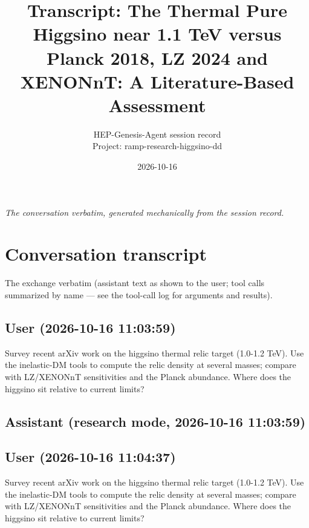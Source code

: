 \documentclass[11pt,a4paper]{article}
\title{Transcript: The Thermal Pure Higgsino near 1.1 TeV versus Planck 2018, LZ 2024 and XENONnT: A Literature-Based Assessment}
\author{HEP-Genesis-Agent session record \\ \small Project: ramp-research-higgsino-dd}
\date{2026-10-16}
\begin{document}
\maketitle
\noindent\textit{\small The conversation verbatim, generated mechanically from the session record.}
\vspace{1em}



\appendix
\section{Conversation transcript}
\label{app:transcript}
The exchange verbatim (assistant text as shown to the user; tool calls summarized by name --- see the tool-call log for arguments and results).
\subsection*{User \small(2026-10-16 11:03:59)}
Survey recent arXiv work on the higgsino thermal relic target (1.0-1.2 TeV). Use the inelastic-DM tools to compute the relic density at several masses; compare with LZ/XENONnT sensitivities and the Planck abundance. Where does the higgsino sit relative to current limits?

\subsection*{Assistant \small(research mode, 2026-10-16 11:03:59)}
\subsection*{User \small(2026-10-16 11:04:37)}
Survey recent arXiv work on the higgsino thermal relic target (1.0-1.2 TeV). Use the inelastic-DM tools to compute the relic density at several masses; compare with LZ/XENONnT sensitivities and the Planck abundance. Where does the higgsino sit relative to current limits?
\end{document}
